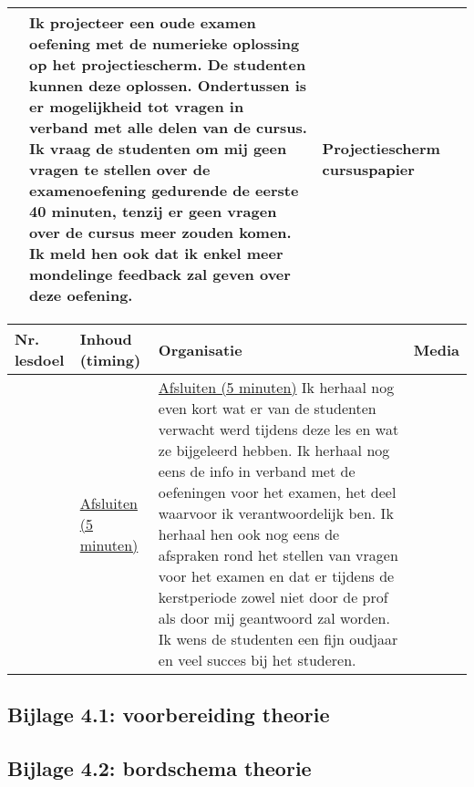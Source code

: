 \begin{landscape}
\begin{tabularx}{1.56\textwidth}{|p{1.5cm}|p{6cm}|X|p{4cm}|}
	&  Ik projecteer een oude examen oefening met de numerieke oplossing op het projectiescherm. De studenten kunnen deze oplossen. Ondertussen is er mogelijkheid tot vragen in verband met alle delen van de cursus. Ik vraag de studenten om mij geen vragen te stellen over de examenoefening gedurende de eerste 40 minuten, tenzij er geen vragen over de cursus meer zouden komen. Ik meld hen ook dat ik enkel meer mondelinge feedback zal geven over deze oefening. 
	& Projectiescherm \newline cursuspapier 
	\\ \hline
\end{tabularx}


	
\begin{tabularx}{1.56\textwidth}{|p{1.5cm}|p{6cm}|X|p{4cm}|}
	\hline
	\textbf{Nr. lesdoel } & \textbf{Inhoud (timing)}  & \textbf{Organisatie } & \textbf{Media } \\ \hline
	&\underline{Afsluiten (5 minuten)}\newline 
	&  \underline{Afsluiten (5 minuten)}\newline
	Ik herhaal nog even kort wat er van de studenten verwacht werd tijdens deze les en wat ze bijgeleerd hebben. Ik herhaal nog eens de info in verband met de oefeningen voor het examen, het deel waarvoor ik verantwoordelijk ben. Ik herhaal hen ook nog eens de afspraken rond het stellen van vragen voor het examen en dat er tijdens de kerstperiode zowel niet door de prof als door mij geantwoord zal worden.  Ik wens de studenten een fijn oudjaar en veel succes bij het studeren.
	& 
	\\ \hline
\end{tabularx}
	
	
	
	
	
	
	
\end{landscape}


\subsection*{Bijlage 4.1: voorbereiding theorie}

\subsection*{Bijlage 4.2: bordschema theorie}








